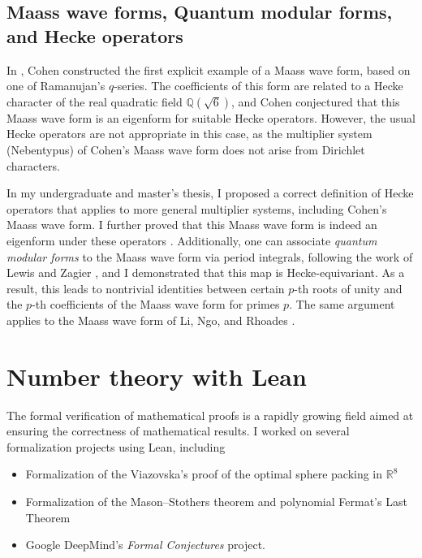 \documentclass[letterpaper, 10pt]{article}
\begin{document}
\subsection{Maass wave forms, Quantum modular forms, and Hecke operators}


In \cite{cohen1988q}, Cohen constructed the first explicit example of a Maass wave form, based on one of Ramanujan's $q$-series. The coefficients of this form are related to a Hecke character of the real quadratic field $\mathbb{Q}(\sqrt{6})$, and Cohen conjectured that this Maass wave form is an eigenform for suitable Hecke operators. However, the usual Hecke operators are not appropriate in this case, as the multiplier system (Nebentypus) of Cohen's Maass wave form does not arise from Dirichlet characters.

In my undergraduate and master's thesis, I proposed a correct definition of Hecke operators that applies to more general multiplier systems, including Cohen's Maass wave form. I further proved that this Maass wave form is indeed an eigenform under these operators \cite{lee2018quantum,lee2019maass}. Additionally, one can associate \emph{quantum modular forms} to the Maass wave form via period integrals, following the work of Lewis and Zagier \cite{lewis2001period,zagier2010quantum}, and I demonstrated that this map is Hecke-equivariant. As a result, this leads to nontrivial identities between certain $p$-th roots of unity and the $p$-th coefficients of the Maass wave form for primes $p$. The same argument applies to the Maass wave form of Li, Ngo, and Rhoades \cite{li2013renormalization}.


\section{Number theory with Lean}

The formal verification of mathematical proofs is a rapidly growing field aimed at ensuring the correctness of mathematical results.
I worked on several formalization projects using Lean, including
\begin{itemize}
  \item Formalization of the Viazovska's proof of the optimal sphere packing in $\mathbb{R}^{8}$
  \item Formalization of the Mason--Stothers theorem and polynomial Fermat's Last Theorem
  \item Google DeepMind's \emph{Formal Conjectures} project.
\end{itemize}
\end{document}
